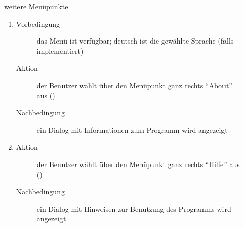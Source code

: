 \begin{description}
	\item[] weitere Menüpunkte
	\begin{enumerate}
		\item
		\begin{description}
			\item[Vorbedingung] das Menü ist verfügbar; deutsch ist die gewählte Sprache (falls  implementiert)
			\item[Aktion] der Benutzer wählt über den Menüpunkt ganz rechts \enquote{About} aus ()
			\item[Nachbedingung] ein Dialog mit Informationen zum Programm wird angezeigt
		\end{description}
		\item
		\begin{description}
			\item[Aktion] der Benutzer wählt über den Menüpunkt ganz rechts \enquote{Hilfe} aus ()
			\item[Nachbedingung] ein Dialog mit Hinweisen zur Benutzung des Programms wird angezeigt
		\end{description}
	\end{enumerate}
\end{description}
\pagebreak
